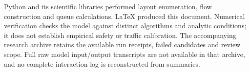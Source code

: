 \documentclass[12pt,letterpaper]{article}
\begin{document}
Python and its scientific libraries performed layout enumeration, flow construction and queue calculations. LaTeX produced this document. Numerical verification checks the model against distinct algorithms and analytic conditions; it does not establish empirical safety or traffic calibration. The accompanying research archive retains the available run receipts, failed candidates and review scope. Full raw model input/output transcripts are not available in that archive, and no complete interaction log is reconstructed from summaries.
\end{document}
